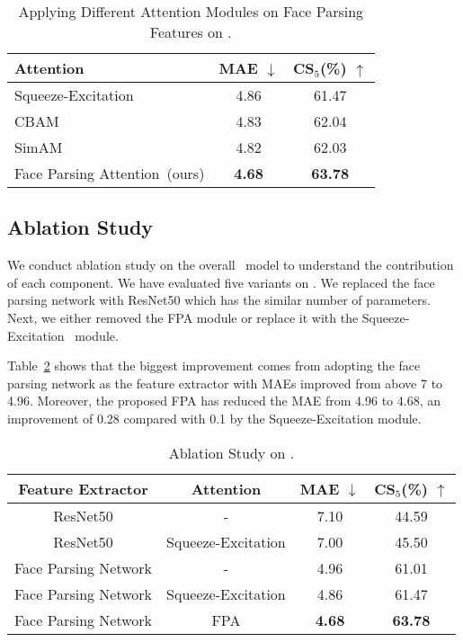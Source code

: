 \begin{table}[h]
    \caption{Applying Different Attention Modules on Face Parsing Features on \imdbc.}
    \label{tab:which-attention-module}
    \centering
    \begin{tabular}{l|c|c}
    \toprule
        Attention & MAE $\downarrow$ & CS$_5$(\%) $\uparrow$ \\ \hline
        Squeeze-Excitation~\cite{Hu_2018_CVPR} & 4.86 & 61.47 \\
        CBAM\cite{Woo_2018_ECCV} & 4.83 & 62.04 \\
        SimAM\cite{SimAM} & 4.82 & 62.03 \\
        \hline
        Face Parsing Attention~(ours) & \textbf{4.68} & \textbf{63.78} \\
    \bottomrule
    \end{tabular}
\end{table}


\subsection{Ablation Study}

We conduct ablation study on the overall \fpage~model to understand the contribution of each component. We have evaluated five variants on \imdbc.  We replaced the face parsing network with ResNet50 which has the similar number of parameters. Next, we either removed the FPA module or replace it with the Squeeze-Excitation~\cite{Hu_2018_CVPR} module. 

Table~\ref{tab:ablation-study} shows that the biggest improvement comes from adopting the face parsing network as the feature extractor with MAEs improved from above 7 to 4.96. Moreover, the proposed FPA has reduced the MAE from 4.96 to 4.68, an improvement of 0.28 compared with 0.1 by the Squeeze-Excitation module.

\begin{table}[h]
    \caption{Ablation Study on \imdbc.}
    \label{tab:ablation-study}
    \centering
    \begin{tabular}{c|c|c|c}
    \toprule
        Feature Extractor & Attention & MAE $\downarrow$ & CS$_5$(\%) $\uparrow$ \\ \hline
        ResNet50 & - & 7.10 & 44.59 \\
        ResNet50 & Squeeze-Excitation & 7.00 & 45.50 \\
        Face Parsing Network & - & 4.96 & 61.01 \\
        Face Parsing Network & Squeeze-Excitation &4.86 & 61.47\\ \hline
        Face Parsing Network  & FPA & \textbf{4.68} & \textbf{63.78}\\
        
    \bottomrule
    \end{tabular}
\end{table}
